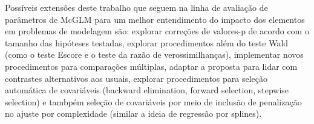 Possíveis extensões deste trabalho que seguem na linha de avaliação de parâmetros de McGLM para um melhor entendimento do impacto dos elementos em problemas de modelagem são: explorar correções de valores-p de acordo com o tamanho das hipóteses testadas, explorar procedimentos além do teste Wald (como o teste Escore e o teste da razão de verossimilhanças), implementar novos procedimentos para comparações múltiplas, adaptar a proposta para lidar com contrastes alternativos aos usuais, explorar procedimentos para seleção automática de covariáveis (backward elimination, forward selection, stepwise selection) e tambpém seleção de covariáveis por meio de inclusão de penalização no ajuste por complexidade (similar a ideia de regressão por splines).

